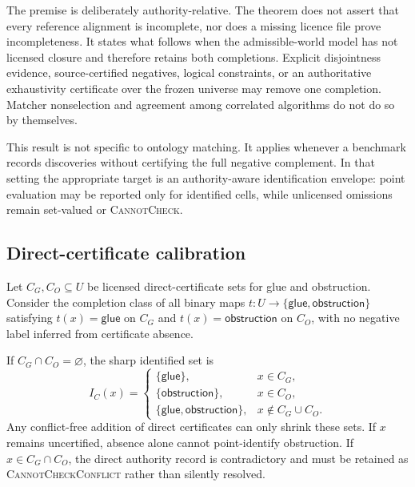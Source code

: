 The premise is deliberately authority-relative. The theorem does not assert
that every reference alignment is incomplete, nor does a missing licence file
prove incompleteness. It states what follows when the admissible-world model has
not licensed closure and therefore retains both completions. Explicit
disjointness evidence, source-certified negatives, logical constraints, or an
authoritative exhaustivity certificate over the frozen universe may remove one
completion. Matcher nonselection and agreement among correlated algorithms do
not do so by themselves.

This result is not specific to ontology matching. It applies whenever a
benchmark records discoveries without certifying the full negative complement.
In that setting the appropriate target is an authority-aware identification
envelope: point evaluation may be reported only for identified cells, while
unlicensed omissions remain set-valued or \textsc{CannotCheck}.

\subsection{Direct-certificate calibration}

Let $C_G,C_O\subseteq U$ be licensed direct-certificate sets for glue and
obstruction.  Consider the completion class of all binary maps
$t:U\rightarrow\{\mathsf{glue},\mathsf{obstruction}\}$ satisfying
$t(x)=\mathsf{glue}$ on $C_G$ and $t(x)=\mathsf{obstruction}$ on $C_O$, with
no negative label inferred from certificate absence.

\begin{corollary}
\label{cor:direct-certificate-identification}
If $C_G\cap C_O=\varnothing$, the sharp identified set is
\begin{equation}
 I_C(x)=
 \begin{cases}
  \{\mathsf{glue}\}, & x\in C_G,\\
  \{\mathsf{obstruction}\}, & x\in C_O,\\
  \{\mathsf{glue},\mathsf{obstruction}\}, & x\notin C_G\cup C_O.
 \end{cases}
\end{equation}
Any conflict-free addition of direct certificates can only shrink these sets.
If $x$ remains uncertified, absence alone cannot point-identify obstruction.
If $x\in C_G\cap C_O$, the direct authority record is contradictory and must
be retained as \textsc{CannotCheckConflict} rather than silently resolved.
\end{corollary}

